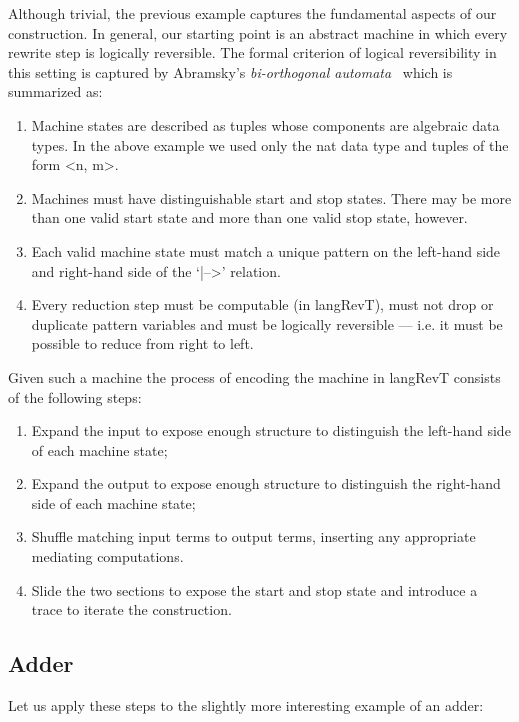 \documentclass{llncs}
\begin{document}
Although trivial, the previous example captures the fundamental aspects of
our construction. In general, our starting point is an abstract machine in
which every rewrite step is logically reversible. The formal criterion of
logical reversibility in this setting is captured by Abramsky's
\emph{bi-orthogonal automata}~\cite[Sec.~2]{abramsky2005structural} which is
summarized as:
\begin{enumerate}
\item 
 Machine states are described as tuples whose components are algebraic
 data types. In the above example we used only the {{nat}} data type
 and tuples of the form {{<n, m>}}.
\item
  Machines must have distinguishable start and stop states. There may
  be more than one valid start state and more than one valid stop
  state, however. 

\item Each valid machine state must match a unique pattern on the
  left-hand side and right-hand side of the `{{|-->}}' relation. 

\item Every reduction step must be computable (in {{langRevT}}), must
  not drop or duplicate pattern variables and must be logically
  reversible --- i.e. it must be possible to reduce from right to
  left.
\end{enumerate}
Given such a machine the process of encoding the machine in {{langRevT}}
consists of the following steps:
\begin{enumerate}
\item Expand the input to expose enough structure to distinguish the
  left-hand side of each machine state;
\item Expand the output to expose enough structure to distinguish the
  right-hand side of each machine state;
\item Shuffle matching input terms to output terms, inserting any appropriate
  mediating computations. 
\item Slide the two sections to expose the start and stop state and
  introduce a {{trace}} to iterate the construction. 
\end{enumerate}

\subsection{Adder} 
\label{sec:adder}

Let us apply these steps to the slightly more interesting example of an
adder:
\end{document}
